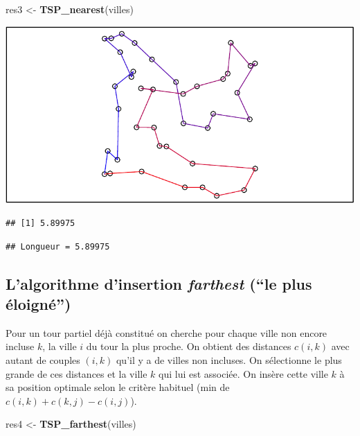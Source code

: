 \documentclass[
]{article}
\newenvironment{Shaded}{\begin{snugshade}}{\end{snugshade}}
\newcommand{\FunctionTok}[1]{\textcolor[rgb]{0.13,0.29,0.53}{\textbf{#1}}}
\newcommand{\NormalTok}[1]{#1}
\newcommand{\OtherTok}[1]{\textcolor[rgb]{0.56,0.35,0.01}{#1}}
\begin{document}
\begin{Shaded}
\begin{Highlighting}[]
\NormalTok{res3 }\OtherTok{\textless{}{-}} \FunctionTok{TSP\_nearest}\NormalTok{(villes)}
\end{Highlighting}
\end{Shaded}

\includegraphics{TSP_analyse_files/figure-latex/unnamed-chunk-9-1.pdf}

\begin{verbatim}
## [1] 5.89975
\end{verbatim}

\begin{verbatim}
## Longueur = 5.89975
\end{verbatim}

\subsection{\texorpdfstring{L'algorithme d'insertion \emph{farthest}
(``le plus
éloigné'')}{L'algorithme d'insertion farthest (``le plus éloigné'')}}\label{lalgorithme-dinsertion-farthest-le-plus-uxe9loignuxe9}

Pour un tour partiel déjà constitué on cherche pour chaque ville non
encore incluse \(k\), la ville \(i\) du tour la plus proche. On obtient
des distances \(c(i,k)\) avec autant de couples \((i,k)\) qu'il y a de
villes non incluses. On sélectionne le plus grande de ces distances et
la ville \(k\) qui lui est associée. On insère cette ville \(k\) à sa
position optimale selon le critère habituel (min de
\(c(i,k) + c(k,j) - c(i,j)\)).

\begin{Shaded}
\begin{Highlighting}[]
\NormalTok{res4 }\OtherTok{\textless{}{-}} \FunctionTok{TSP\_farthest}\NormalTok{(villes)}
\end{Highlighting}
\end{Shaded}
\end{document}
